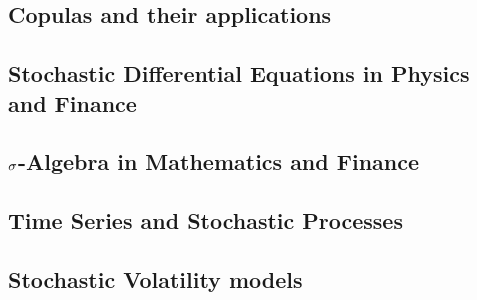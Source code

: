 \documentclass[11pt]{article}
\begin{document}
\subsection{Copulas and their applications}

\subsection{Stochastic Differential Equations in Physics and Finance}

\subsection{$\Huge{\sigma}$-Algebra in Mathematics and Finance}

\subsection{Time Series and Stochastic Processes}

\subsection{Stochastic Volatility models}
\end{document}
